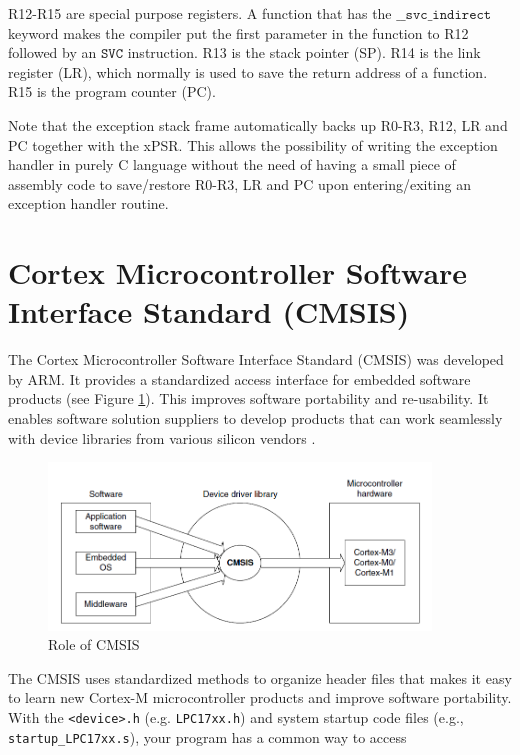 R12-R15 are special purpose registers. 
A function that has the $\mathtt{\_\_svc\_indirect}$ keyword 
makes the compiler put the first parameter in 
the function to R12 followed by an $\mathtt{SVC}$ instruction. 
R13 is the stack pointer (SP). 
R14 is the link register (LR), which normally is used to save 
the return address of a function. 
R15 is the program counter (PC).

Note that the exception stack frame automatically backs up R0-R3, 
R12, LR and PC together with the xPSR. 
This allows the possibility of writing the exception handler 
in purely C language without the need of having a small piece of 
assembly code to save/restore R0-R3, LR and PC upon entering/exiting 
an exception handler routine.

\section{Cortex Microcontroller Software Interface Standard (CMSIS)}

The Cortex Microcontroller Software Interface Standard (CMSIS) was developed by ARM. It provides a standardized access interface for embedded software products  (see Figure \ref{fig_cmsis1}). This improves software portability and re-usability. It enables software solution suppliers to develop products that can work seamlessly with device libraries from various silicon vendors \cite{keil.mdk.primer}.

\begin{figure}[ht]
\centerline{\includegraphics[width=4in]{figure/CMSIS1}}
\caption[Role of CMSIS]{Role of CMSIS\cite{yiu2009definitive}} 
\label{fig_cmsis1}
\end{figure}

The CMSIS uses standardized methods to organize header files that makes it easy to learn new Cortex-M microcontroller products and improve software portability. With the \verb|<device>.h| (e.g. \verb|LPC17xx.h|) and 
system startup code files (e.g., \verb|startup_LPC17xx.s|), 
your program has a common way to access 


